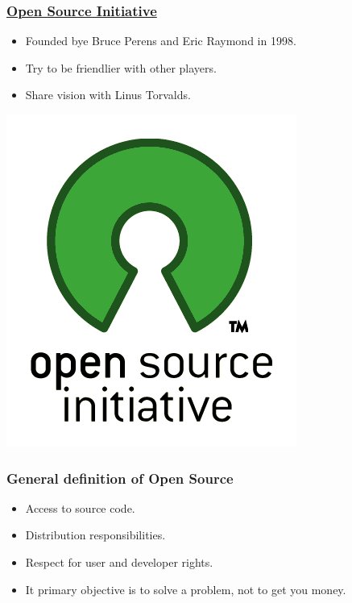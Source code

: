 \documentclass[hyperref={pdfpagelabels=false},xcolor=pst,pdf,fragile]{beamer}
\begin{document}
\begin{frame}
  \frametitle{
	  \href{http://opensource.org/}
	  {Open Source Initiative}
  }

  \begin{itemize}
	\item Founded bye Bruce Perens and Eric Raymond in 1998.
	\item Try to be friendlier with other players.
	\item Share vision with Linus Torvalds.
  \end{itemize}

  \begin{center}
	  \includegraphics[scale=0.3]{img/osi_standard_logo.png}
  \end{center}

\end{frame}


\begin{frame}
  \frametitle{General definition of Open Source}

  \begin{itemize}
	\item Access to source code.
	\item Distribution responsibilities.
	\item Respect for user and developer rights.
	\item It primary objective is to solve a problem, not to get you money.
  \end{itemize}

\end{frame}
\end{document}
